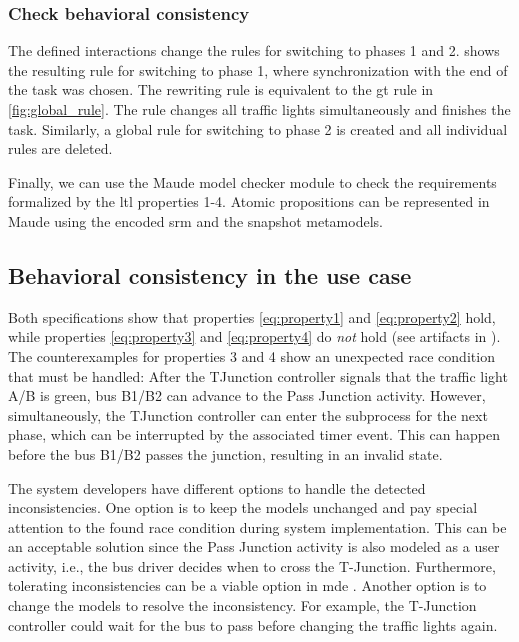 \documentclass{jot}
\begin{document}
\subsubsection{Check behavioral consistency}
The defined interactions change the rules for switching to phases 1 and 2.
 shows the resulting rule for switching to phase 1, where synchronization with the end of the task was chosen.
The rewriting rule is equivalent to the \gls*{gt} rule in \cref{fig:global_rule}.
The rule changes all traffic lights simultaneously and finishes the task.
Similarly, a global rule for switching to phase 2 is created and all individual rules are deleted.



Finally, we can use the Maude model checker module to check the requirements formalized by the \gls*{ltl} properties 1-4.
Atomic propositions can be represented in Maude using the encoded \gls*{srm} and the snapshot metamodels.


\subsection{Behavioral consistency in the use case}
Both specifications show that properties \eqref{eq:property1} and \eqref{eq:property2} hold, while properties \eqref{eq:property3} and \eqref{eq:property4} do \emph{not} hold (see artifacts in \cite{krauterArtifactsBehavioralConsistency2022}).
The counterexamples for properties 3 and 4 show an unexpected race condition that must be handled:
After the TJunction controller signals that the traffic light A/B is green, bus B1/B2 can advance to the \textsf{Pass Junction} activity.
However, simultaneously, the TJunction controller can enter the subprocess for the next phase, which can be interrupted by the associated timer event.
This can happen before the bus B1/B2 passes the junction, resulting in an invalid state.

The system developers have different options to handle the detected inconsistencies.
One option is to keep the models unchanged and pay special attention to the found race condition during system implementation.
This can be an acceptable solution since the \textsf{Pass Junction} activity is also modeled as a user activity, i.e., the bus driver decides when to cross the T-Junction.
Furthermore, tolerating inconsistencies can be a viable option in \gls*{mde} \cite{weidmannToleranceModelDrivenEngineering2021}.
Another option is to change the models to resolve the inconsistency.
For example, the T-Junction controller could wait for the bus to pass before changing the traffic lights again.
\end{document}
